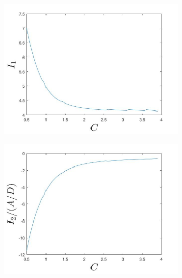 \begin{figure}[h!]
\centering
\begin{subfigure}{.49\textwidth}
  \centering
  \includegraphics[width=\linewidth]{Figures/I1Plot.jpg}
  \caption{}
  \label{fig:ThetaInt1}
\end{subfigure}
\begin{subfigure}{.49\textwidth}
  \centering
  \includegraphics[width=\linewidth]{Figures/I2Plot.jpg}
  \caption{}
  \label{fig:ThetaInt2}
\end{subfigure}
\linebreak
\begin{subfigure}{.49\textwidth}
  \centering

\end{subfigure}
\end{figure}
